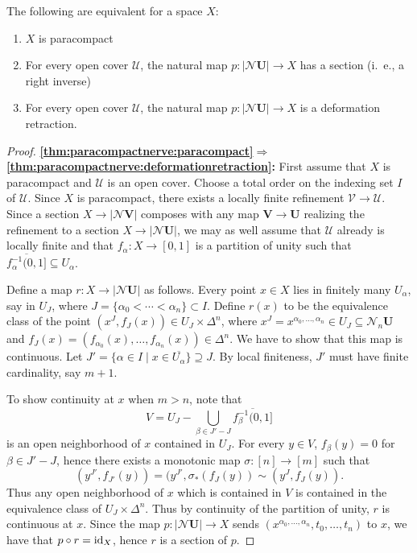 \documentclass[a4paper,openany]{scrbook}
\newcommand{\nerve}{\mathcal N}
\begin{document}
\begin{thm}\label{thm:paracompactnerve}
The following are equivalent for a space $X$:
\begin{enumerate}
\item $X$ is paracompact\label{thm:paracompactnerve:paracompact}
\item For every open cover $\mathcal U$, the natural map $p\colon |\nerve \mathbf U| \to X$ has a section (i.~e., a right inverse)\label{thm:paracompactnerve:section}
\item For every open cover $\mathcal U$, the natural map $p\colon |\nerve \mathbf U| \to X$ is a deformation retraction.\label{thm:paracompactnerve:deformationretraction}
\end{enumerate}
\end{thm}
\begin{proof}
\noindent\textbf{\eqref{thm:paracompactnerve:paracompact}$\Longrightarrow$\eqref{thm:paracompactnerve:deformationretraction}:}
First assume that $X$ is paracompact and $\mathcal U$ is an open cover. Choose a total order on the indexing set $I$ of $\mathcal U$. Since $X$ is paracompact, there exists a locally finite refinement $\mathcal V \to \mathcal U$. Since a section $X \to |\nerve\mathbf V|$ composes with any map $\mathbf V \to \mathbf U$ realizing the refinement to a section $X \to |\nerve\mathbf U|$,  we may as well assume that $\mathcal U$ already is locally finite and that $f_\alpha\colon X \to [0,1]$ is a partition of unity such that $\overline{f_\alpha^{-1}(0,1]} \subseteq U_\alpha$.

Define a map $r\colon X \to |\nerve\mathbf U|$ as follows. Every point $x \in X$ lies in finitely many $U_\alpha$, say in $U_J$, where $J=\{\alpha_0 < \cdots < \alpha_n\} \subset I$. Define $r(x)$ to be the equivalence class of the point $(x^J,f_J(x)) \in U_J \times \Delta^n$, where $x^J = x^{\alpha_0,\dots,\alpha_n} \in U_J \subseteq \nerve_n\mathbf U$ and $f_J(x)=(f_{\alpha_0}(x),\dots,f_{\alpha_n}(x)) \in \Delta^n$. We have to show that this map is continuous. Let $J' = \{\alpha \in I \mid x \in \overline{U_\alpha}\} \supseteq J$. By local finiteness, $J'$ must have finite cardinality, say $m+1$. 

To show continuity at $x$ when $m>n$, note that
\[
V = U_J - \bigcup_{\beta \in J'-J} \overline{f_\beta^{-1}(0,1]}
\]
is an open neighborhood of $x$ contained in $U_J$. For every $y \in V$, $f_{\beta}(y) = 0$ for $\beta \in J'-J$, hence there exists a monotonic map $\sigma\colon [n] \to [m]$ such that
\[
(y^{J'},f_{J'}(y)) = (y^{J'},\sigma_*(f_J(y)) \sim (y^J,f_J(y)).
\]
Thus any open neighborhood of $x$ which is contained in $V$ is contained in the equivalence class of $U_J \times \Delta^n$. Thus by continuity of the partition of unity, $r$ is continuous at $x$. Since the map $p\colon |\nerve \mathbf U| \to X$ sends $(x^{\alpha_0,\dots,\alpha_n},t_0,\dots,t_n)$ to $x$, we have that $p \circ r = \operatorname{id}_X$, hence $r$ is a section of $p$.


\end{proof}
\end{document}
